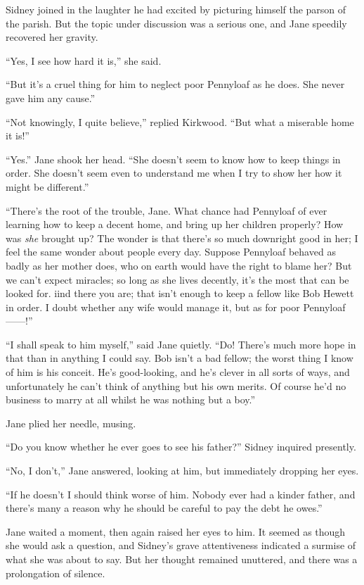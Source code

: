 Sidney joined in the laughter he had {}excited by picturing himself the
parson of the parish. But the topic under discussion was a serious one,
and Jane speedily recovered her gravity.

``Yes, I see how hard it is,'' she said.

``But it's a cruel thing for him to neglect poor Pennyloaf as he does.
She never gave him any cause.''

``Not knowingly, I quite believe,'' replied Kirkwood. ``But what a
miserable home it is!''

``Yes.'' Jane shook her head. ``She doesn't seem to know how to keep
things in order. She doesn't seem even to understand me when I try to
show her how it might be different.''

``There's the root of the trouble, Jane. What chance had Pennyloaf of
ever learning how to keep a decent home, and bring up her children
properly? How was \emph{she} brought up? The wonder is that there's so
much downright good in her; I feel the same wonder about people every
day. Suppose Pennyloaf behaved as badly as her mother {}does, who on
earth would have the right to blame her? But we can't expect miracles;
so long as she lives decently, it's the most that can be looked for.
iind there you are; that isn't enough to keep a fellow like Bob Hewett
in order. I doubt whether any wife would manage it, but as for poor
Pennyloaf{{------}}!''

``I shall speak to him myself,'' said Jane quietly. ``Do! There's much
more hope in that than in anything I could say. Bob isn't a bad fellow;
the worst thing I know of him is his conceit. He's good-looking, and
he's clever in all sorts of ways, and unfortunately he can't think of
anything but his own merits. Of course he'd no business to marry at all
whilst he was nothing but a boy.''

Jane plied her needle, musing.

``Do you know whether he ever goes to see his father?'' Sidney inquired
presently.

``No, I don't,'' Jane answered, looking at him, but immediately dropping
her eyes.

``If he doesn't I should think worse of him. {}Nobody ever had a kinder
father, and there's many a reason why he should be careful to pay the
debt he owes.''

Jane waited a moment, then again raised her eyes to him. It seemed as
though she would ask a question, and Sidney's grave attentiveness
indicated a surmise of what she was about to say. But her thought
remained unuttered, and there was a prolongation of silence.

